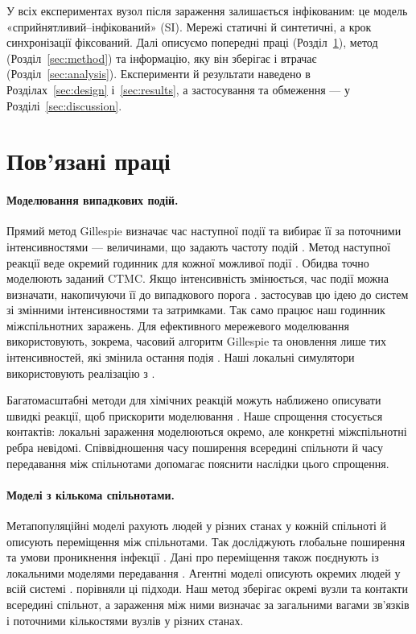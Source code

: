 У всіх експериментах вузол після зараження залишається інфікованим: це модель «сприйнятливий--інфікований» (SI). Мережі статичні й синтетичні, а крок синхронізації фіксований. Далі описуємо попередні праці (Розділ~\ref{sec:related}), метод (Розділ~\ref{sec:method}) та інформацію, яку він зберігає і втрачає (Розділ~\ref{sec:analysis}). Експерименти й результати наведено в Розділах~\ref{sec:design} і~\ref{sec:results}, а застосування та обмеження --- у Розділі~\ref{sec:discussion}.

\clearpage
\section{Пов'язані праці}
\label{sec:related}

\paragraph{Моделювання випадкових подій.}
Прямий метод Gillespie визначає час наступної події та вибирає її за поточними інтенсивностями --- величинами, що задають частоту подій \citep{gillespie1977exact}. Метод наступної реакції веде окремий годинник для кожної можливої події \citep{gibson2000}. Обидва точно моделюють заданий CTMC. Якщо інтенсивність змінюється, час події можна визначати, накопичуючи її до випадкового порога \citep{ethier1986}. \citet{anderson2007} застосував цю ідею до систем зі змінними інтенсивностями та затримками. Так само працює наш годинник міжспільнотних заражень. Для ефективного мережевого моделювання використовують, зокрема, часовий алгоритм Gillespie та оновлення лише тих інтенсивностей, які змінила остання подія \citep{vestergaard2015,kuryliak2025simulating}. Наші локальні симулятори використовують реалізацію з \citet{kuryliak2025simulating}.

Багатомасштабні методи для хімічних реакцій можуть наближено описувати швидкі реакції, щоб прискорити моделювання \citep{haseltine2002,cao2005slow}. Наше спрощення стосується контактів: локальні зараження моделюються окремо, але конкретні міжспільнотні ребра невідомі. Співвідношення часу поширення всередині спільноти й часу передавання між спільнотами допомагає пояснити наслідки цього спрощення.

\paragraph{Моделі з кількома спільнотами.}
Метапопуляційні моделі рахують людей у різних станах у кожній спільноті й описують переміщення між спільнотами. Так досліджують глобальне поширення та умови проникнення інфекції \citep{colizza2007reaction,colizza2008,balcan2009,balcan2010modeling}. Дані про переміщення також поєднують із локальними моделями передавання \citep{chang2021}. Агентні моделі описують окремих людей у всій системі \citep{eubank2004,kerr2021}. \citet{ajelli2010} порівняли ці підходи. Наш метод зберігає окремі вузли та контакти всередині спільнот, а зараження між ними визначає за загальними вагами зв'язків і поточними кількостями вузлів у різних станах.

